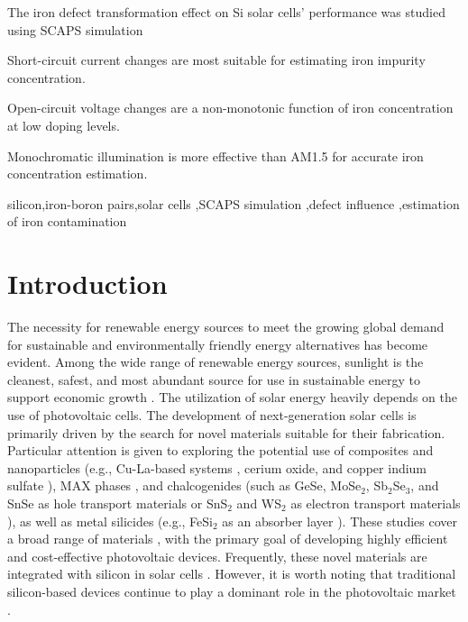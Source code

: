 \documentclass[a4paper,fleqn]{cas-sc}
\begin{document}

\begin{highlights}
\item The iron defect transformation effect on Si solar cells' performance was studied using SCAPS simulation
\item Short-circuit current changes are most suitable for estimating iron impurity concentration.
\item Open-circuit voltage changes are a non-monotonic function of iron concentration at low doping levels.
\item Monochromatic illumination is more effective than AM1.5 for accurate iron concentration estimation.
\end{highlights}


\begin{keywords}
 silicon\sep iron-boron pairs\sep solar cells \sep SCAPS simulation \sep defect influence \sep estimation of iron contamination
\end{keywords}

\maketitle

\section{Introduction}%
\par
The necessity for renewable energy sources to meet the growing global demand for sustainable and environmentally friendly energy alternatives has become evident.
Among the wide range of renewable energy sources, sunlight is the cleanest, safest,
and most abundant source for use in sustainable energy to support economic growth \cite{PratapSingh2019}.
The utilization of solar energy heavily depends on the use of photovoltaic cells.
The development of next-generation solar cells is primarily driven by the search for novel materials suitable for their fabrication.
Particular attention is given to exploring the potential use of composites and nanoparticles
(e.g., Cu-La-based systems \cite{Paul2024}, cerium oxide, and copper indium sulfate \cite{Gayathri2024}),
MAX phases \cite{Behera2024,AzzouzRached2024},
and chalcogenides (such as GeSe, MoSe$_2$, Sb$_2$Se$_3$, and SnSe as hole transport materials \cite{MasumMia2025}
or SnS$_2$ and WS$_2$ as electron transport materials \cite{Rahman2024}),
as well as metal silicides (e.g., FeSi$_2$ as an absorber layer \cite{Sultana2024}).
These studies cover a broad range of materials \cite{AlanSibu2024}, with the primary goal of developing highly efficient and cost-effective photovoltaic devices.
Frequently, these novel materials are integrated with silicon in solar cells \cite{Sultana2024, Akila2024}.
However, it is worth noting that traditional silicon-based devices
continue to play a dominant role in the photovoltaic market \cite{Basnet2024,Wang2024}.
\end{document}
